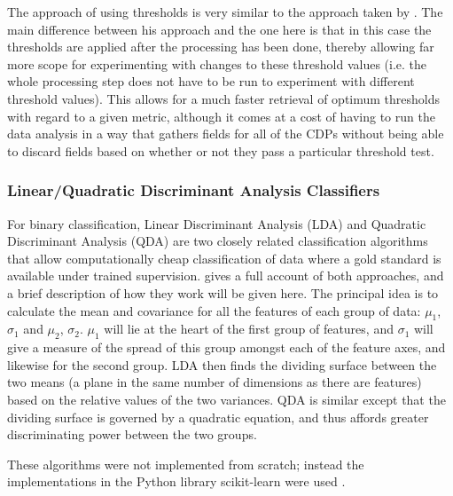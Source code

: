 \documentclass[pdftex,12pt,a4paper]{report}
\begin{document}
The approach of using thresholds is very similar to the approach taken by
\textcite{walsh1997objective}. The main difference between his approach and the one here is that in
this case the thresholds are applied after the processing has been done, thereby allowing far more
scope for experimenting with changes to these threshold values (i.e. the whole processing step does
not have to be run to experiment with different threshold values). This allows for a much faster
retrieval of optimum thresholds with regard to a given metric, although it comes at a cost of having
to run the data analysis in a way that gathers fields for all of the CDPs without being able to
discard fields based on whether or not they pass a particular threshold test.


\subsubsection{Linear/Quadratic Discriminant Analysis Classifiers}

For binary classification, Linear Discriminant Analysis (LDA) and Quadratic Discriminant Analysis
(QDA) are two closely related classification algorithms that allow computationally cheap
classification of data where a gold standard is available under trained supervision.
\textcite{mclachlan2004discriminant} gives a full account of both approaches, and a brief description of how they
work will be given here. The principal idea is to calculate the mean and covariance for all the
features of each group of data: $\mu_1$, $\sigma_1$ and $\mu_2$, $\sigma_2$. $\mu_1$ will lie at the
heart of the first group of features, and $\sigma_1$ will give a measure of the spread of this group
amongst each of the feature axes, and likewise for the second group. LDA then finds the dividing
surface between the two means (a plane in the same number of dimensions as there are features) based
on the relative values of the two variances. QDA is similar except that the dividing surface is
governed by a quadratic equation, and thus affords greater discriminating power between the two
groups.

These algorithms were not implemented from scratch; instead the implementations in the Python
library scikit-learn were used \parencite{scikitLearn2011}.
\end{document}
